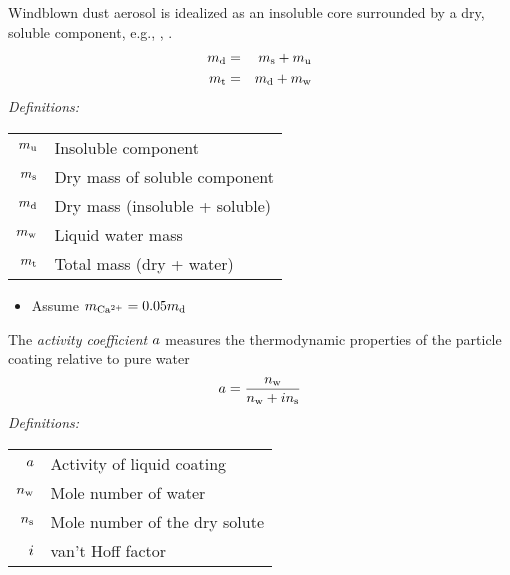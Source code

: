 \documentclass[final,dvips]{foils}
\begin{document}
\rotatefoilhead{%
\Large\textcolor{blue}{\hfill Dust Composition\hfill}}\vspace{-0.5in}\large
Windblown dust aerosol is idealized as an insoluble core surrounded by
a dry, soluble component, e.g., \CaCOt, \NaCl.  
\begin{eqnarray}
m_{\mathrm{d}} & = & m_{\mathrm{s}} + m_{\mathrm{u}} \\
m_{\mathrm{t}} & = & m_{\mathrm{d}} + m_{\mathrm{w}}
\label{eqn:mss_aer_ttl_dfn}
\end{eqnarray}
\emph{Definitions:}
\begin{table}
\begin{tabular}{ >{$}r<{$} l}
\mssaernsl & Insoluble component \\[0.0ex]
\mssaerslt & Dry mass of soluble component \\[0.0ex]
\mssaerdry & Dry mass (insoluble + soluble) \\[0.0ex]
\mssaerwtr & Liquid water mass \\[0.0ex]
\mssaerttl & Total mass (dry + water) \\[0.0ex]
\end{tabular}
\end{table}
\begin{itemize}
\item Assume $\mssaerCadp = 0.05 \mssaerdry$
\end{itemize}

\rotatefoilhead{%
\Large\textcolor{blue}{\hfill Activity Coefficient \hfill}}\vspace{-0.5in}\large
The \textit{activity coefficient} $\actcff$ measures the thermodynamic
properties of the particle coating relative to pure water
\begin{equation}
a = { n_{\mathrm{w}} \over n_{\mathrm{w}} + i n_{\mathrm{s}} }
\label{eqn:act_cff_dfn}
\end{equation}
\emph{Definitions:}
\begin{table}
\begin{tabular}{ >{$}r<{$} l}
\actcff & Activity of liquid coating \\[1.0ex]
\molnbrwtr & Mole number of water \\[1.0ex]
\molnbrslt & Mole number of the dry solute \\[1.0ex]
\vnthff & van't Hoff factor \\[1.0ex]
\end{tabular}
\end{table}
\end{document}
